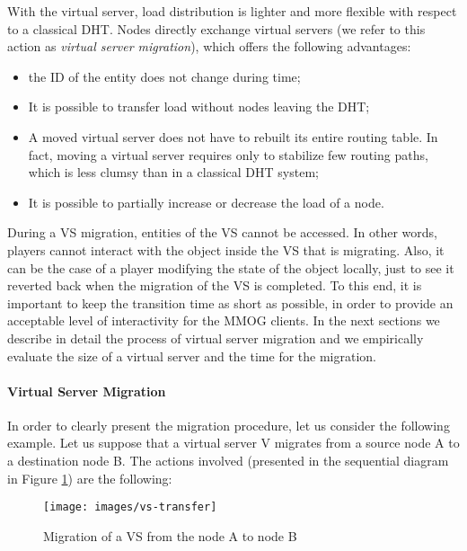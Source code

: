 \documentclass[final,10pt,a5paper]{phdimt}
\theoremstyle{definition}
\begin{document}
With the virtual server, load distribution is lighter and more flexible with respect to a classical DHT.
Nodes directly exchange virtual servers (we refer to this action as \textit{virtual server migration}), which offers the following advantages:

\begin{itemize}
\item the ID of the entity does not change during time;
\item It is possible to transfer load without nodes leaving the DHT;
\item A moved virtual server does not have to rebuilt its entire routing table. In fact, moving a virtual server requires only to stabilize few routing paths, which is less clumsy than in a classical DHT system;
\item It is possible to partially increase or decrease the load of a node.
\end{itemize}



During a VS migration, entities of the VS cannot be accessed. 
In other words, players cannot interact with the object inside the VS that is migrating.
Also, it can be the case of a player modifying the state of the object locally, just to see it reverted back when the migration of the VS is completed.
To this end, it is important to keep the transition time as short as possible, in order to provide an acceptable level of interactivity for the MMOG clients. 
In the next sections we describe in detail the process of virtual server migration and we empirically evaluate the size of a virtual server and the time for the migration.



\paragraph{Virtual Server Migration}

In order to clearly present the migration procedure, let us consider the following example. 
Let us suppose that a virtual server V migrates from a source node A to a destination node B. 
The actions involved (presented in the sequential diagram in Figure \ref{fig:vs-transfer}) are the following:


\begin{figure}[tbh]
\centering
\texttt{[image: images/vs-transfer]}
\caption{Migration of a VS from the node A to node B}\label{fig:vs-transfer}
\end{figure}
\end{document}
